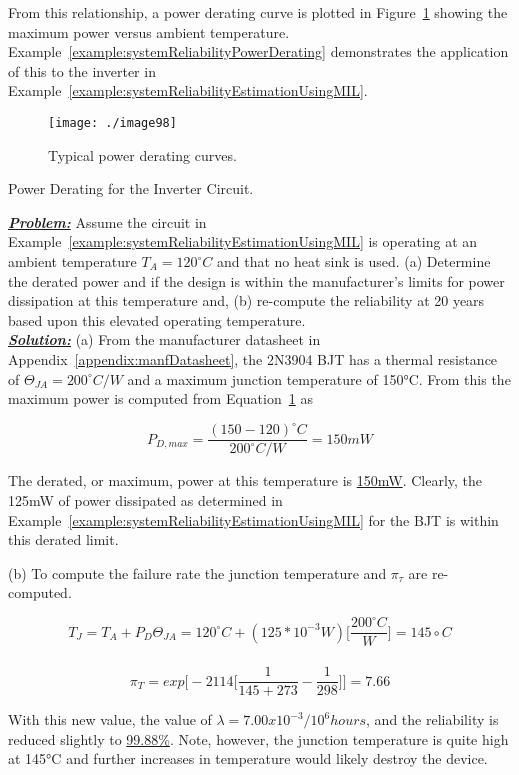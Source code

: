 {From this relationship, a power derating curve is plotted in 
Figure~\ref{figure:typicalDeratingCurve}
showing the maximum power versus ambient temperature. 
Example~\ref{example:systemReliabilityPowerDerating}
demonstrates the application of this to the inverter in 
Example~\ref{example:systemReliabilityEstimationUsingMIL}.

\begin{figure}[h]
\centering
\texttt{[image: ./image98]}
\caption{Typical power derating curves.}
\label{figure:typicalDeratingCurve}
\end{figure}

\begin{example}{Power Derating for the Inverter Circuit.}
\label{example:systemReliabilityPowerDerating}

\emph{\textbf{\ul{Problem:}}} Assume the circuit in 
Example~\ref{example:systemReliabilityEstimationUsingMIL} is
operating at an ambient temperature $T_A = 120^\circ C$ and 
that no heat sink is used.
(a) Determine the derated power and if the design is within the
manufacturer's limits for power dissipation at this temperature and, (b)
re-compute the reliability at 20 years based upon this elevated
operating temperature.\\

\noindent\emph{\textbf{\ul{Solution:}}}
(a) From the manufacturer datasheet in Appendix~\ref{appendix:manfDatasheet}, 
the 2N3904 BJT has a
thermal resistance of $\Theta_{JA} = 200^\circ C/W$ and a
maximum junction temperature of 150°C. From this the maximum power is
computed from Equation~\ref{figure:typicalDeratingCurve} as

$$P_{D,max} = \frac{(150 - 120)^\circ C}{200^\circ C/W} = 150mW$$

The derated, or maximum, power at this temperature is \ul{150mW}.
Clearly, the 125mW of power dissipated as determined in 
Example~\ref{example:systemReliabilityEstimationUsingMIL} for
the BJT is within this derated limit.

(b) To compute the failure rate the junction temperature and
$\pi_\tau$ are re-computed.

$$T_J = T_A + P_D\Theta_{JA} = 120^\circ C + (125*10^{-3} W) \big[ \frac{200^\circ C}{W} \big]= 145\circ C $$\\
$$\pi_T = exp\big[ -2114 \big[ \frac{1}{145+273} - \frac{1}{298} \big] \big] = 7.66$$
\end{example}

With this new value, the value of $\lambda=7.00x10^{-3}/10^6 hours$, and 
the reliability is reduced slightly to \ul{99.88\%}. Note, however, the junction 
temperature is
quite high at 145°C and further increases in temperature would likely
destroy the device.

}
